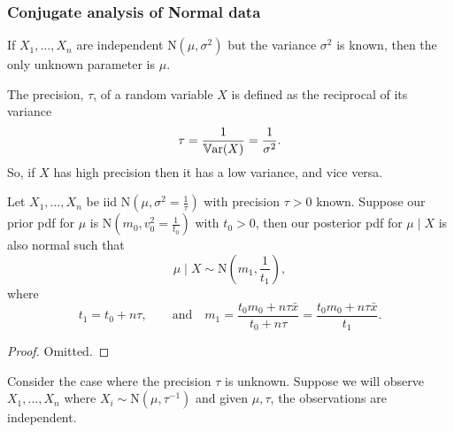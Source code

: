 \documentclass[10pt, a4paper]{article}
\begin{document}
\subsubsection{Conjugate analysis of Normal data}

If $X_1, \dotsc, X_n$ are independent $\mathrm{N}(\mu, \sigma ^ 2)$ but the variance $\sigma ^ 2$ is known,
then the only unknown parameter is $\mu$.

\begin{definition}[Precision]
    The precision,
    $\tau$,
    of a random variable $X$ is defined as the reciprocal of its variance
    \[
    \tau = \frac{1}{\mathbb{V}\mathrm{ar}(X)} = \frac{1}{\sigma ^ 2}.
    \]
    So,
    if $X$ has high precision then it has a low variance,
    and vice versa.
\end{definition}

\begin{theorem}
    Let $X_1, \dotsc, X_n$ be iid $\mathrm{N}(\mu, \sigma ^ 2 = \frac{1}{\tau})$ with precision $\tau > 0$ known.
    Suppose our prior pdf for $\mu$ is $\mathrm{N}(m_0, v_0 ^ 2 = \frac{1}{t_0})$ with $t_0 > 0$,
    then our posterior pdf for $\mu \mid X$ is also normal such that
    \[
    \mu \mid X \sim \mathrm{N}\left(m_1, \frac{1}{t_1}\right),
    \]
    where
    \[
    t_1 = t_0 + n\tau,\qquad\text{and}\quad m_1 = \frac{t_0m_0 + n\tau\bar{x}}{t_0 + n\tau} = \frac{t_0m_0 + n\tau\bar{x}}{t_1}.
    \]

    \begin{proof}
        Omitted.
    \end{proof}
\end{theorem}

Consider the case where the precision $\tau$ is unknown.
Suppose we will observe $X_1, \dotsc, X_n$ where $X_i \sim \mathrm{N}(\mu, \tau ^ {-1})$ and given $\mu, \tau$,
the observations are independent.
\end{document}
